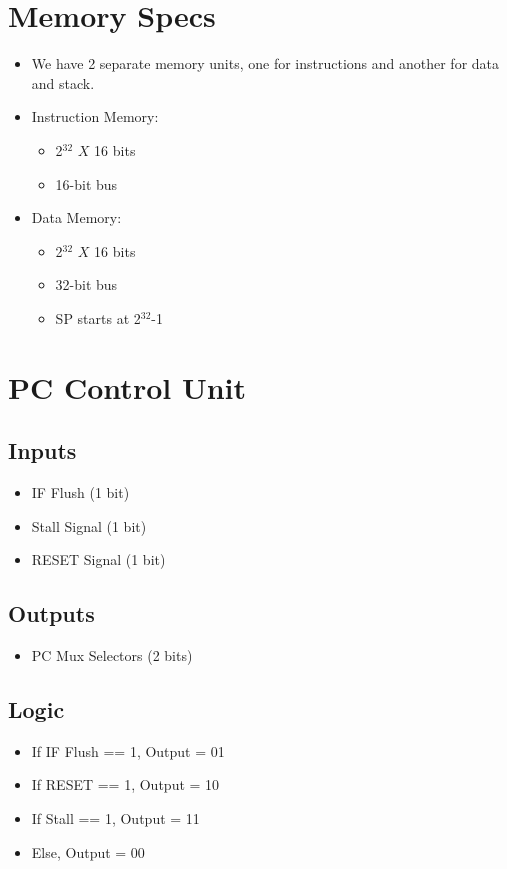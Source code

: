 \documentclass[12pt]{report}
\begin{document}
\section{Memory Specs}
\begin{itemize}
    \item We have 2 separate memory units, one for instructions and another for data and stack.
    \item Instruction Memory:
    \begin{itemize}
        \item 2$^{32}$ $X$ 16 bits
        \item 16-bit bus
    \end{itemize}
    \item Data Memory:
    \begin{itemize}
        \item 2$^{32}$ $X$ 16 bits
        \item 32-bit bus
        \item SP starts at 2$^{32}$-1
    \end{itemize}
\end{itemize}

\section{PC Control Unit}

\subsection{Inputs}
\begin{itemize}
    \item IF Flush (1 bit)
    \item Stall Signal (1 bit)
    \item RESET Signal (1 bit)
\end{itemize}

\subsection{Outputs}
\begin{itemize}
    \item PC Mux Selectors (2 bits)
\end{itemize}

\subsection{Logic}
\begin{itemize}
    \item If IF Flush == 1, Output = 01
    \item If RESET == 1, Output = 10
    \item If Stall == 1, Output = 11
    \item Else, Output = 00
\end{itemize}
\end{document}
